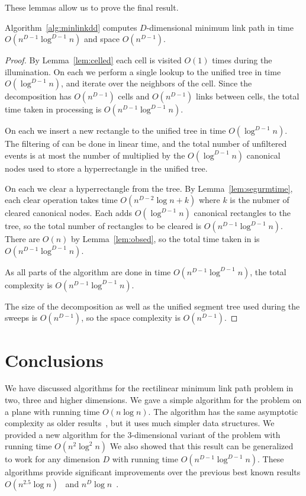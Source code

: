 \documentclass[english,gradu]{tktltiki2018}
\begin{document}
These lemmas allow us to prove the final result.

\begin{theo}Algorithm~\ref{alg:minlinkdd} computes $D$-dimensional minimum link path in time $O(n^{D-1}\log^{D-1}n)$ and space $O(n^{D-1})$.\end{theo}
\begin{proof}
By Lemma~\ref{lem:celled} each cell is visited $O(1)$ times during the illumination.
On each \cellE we perform a single lookup to the unified tree in time $O(\log^{D-1} n)$, and iterate over the neighbors of the cell.
Since the decomposition has $O(n^{D-1})$ cells and $O(n^{D-1})$ links between cells, the total time taken in processing \cellEs is $O(n^{D-1}\log^{D-1} n)$.

On each \addE we insert a new rectangle to the unified tree in time $O(\log^{D-1} n)$.
The filtering of \addEs can be done in linear time, and the total number of unfiltered events is at most the number of \addEs multiplied by the $O(\log^{D-1} n)$ canonical nodes used to store a hyperrectangle in the unified tree.

On each \obsE we clear a hyperrectangle from the tree.
By Lemma~\ref{lem:segurmtime}, each clear operation takes time $O(n^{D-2}\log n + k)$ where $k$ is the nubmer of cleared canonical nodes.
Each \addE adds $O(\log^{D-1} n)$ canonical rectangles to the tree, so the total number of rectangles to be cleared is $O(n^{D-1}\log^{D-1} n)$.
There are $O(n)$ \obsEs by Lemma~\ref{lem:obsed}, so the total time taken in \obsEs is $O(n^{D-1}\log^{D-1} n)$.

As all parts of the algorithm are done in time $O(n^{D-1}\log^{D-1} n)$, the total complexity is $O(n^{D-1}\log^{D-1} n)$.

The size of the decomposition as well as the unified segment tree used during the sweeps is $O(n^{D-1})$, so the space complexity is $O(n^{D-1})$.
\end{proof}



\section{Conclusions}\label{sec:conclusions}

We have discussed algorithms for the rectilinear minimum link path problem in two, three and higher dimensions.
We gave a simple algorithm for the problem on a plane with running time $O(n\log n)$.
The algorithm has the same asymptotic complexity as older results~\cite{dasnar,sato}, but it uses much simpler data structures.
We provided a new algorithm for the 3-dimensional variant of the problem with running time $O(n^2\log^2 n)$
We also showed that this result can be generalized to work for any dimension $D$ with running time $O(n^{D-1}\log^{D-1}n)$.
These algorithms provide significant improvements over the previous best known results $O(n^{2.5}\log n)$~\cite{wagner} and $n^D\log n$~\cite{de1992}.
\end{document}
